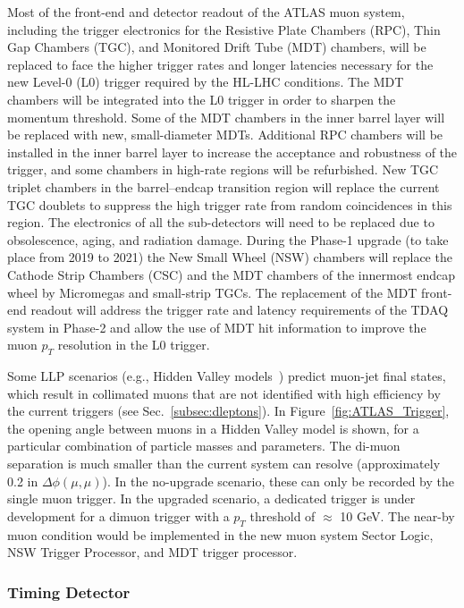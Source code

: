 Most of the front-end and detector readout of the ATLAS muon system, including the trigger electronics for the Resistive Plate Chambers (RPC), Thin Gap Chambers (TGC), and Monitored Drift Tube (MDT) chambers, will be replaced to face the higher trigger rates and longer latencies necessary for the new Level-0 (L0) trigger required by the HL-LHC conditions. The MDT chambers will be integrated into the L0 trigger in order to sharpen the momentum threshold. Some of the MDT chambers in the inner barrel layer will be replaced with new, small-diameter MDTs. Additional RPC chambers will be installed in the inner barrel layer to increase the acceptance and robustness of the trigger, and some chambers in high-rate regions will be refurbished. New TGC triplet chambers in the barrel--endcap transition region will replace the current TGC doublets to suppress the high trigger rate from random coincidences in this region. The electronics of all the sub-detectors will need to be replaced due to obsolescence, aging, and radiation damage. During the Phase-1 upgrade (to take place from 2019 to 2021) the New Small Wheel (NSW) chambers will replace the Cathode Strip Chambers (CSC) and the MDT chambers of the innermost endcap wheel by Micromegas and small-strip TGCs. The replacement of the MDT front-end readout will address the trigger rate and latency requirements of the TDAQ system in Phase-2 and allow the use of MDT hit information to improve the muon $p_T$ resolution in the L0 trigger.

Some LLP scenarios (e.g., Hidden Valley models~\cite{Strassler:2006im}) predict muon-jet final states, which result in collimated muons that are not identified with high efficiency by the current triggers (see Sec.~\ref{subsec:dleptons}). In Figure~\ref{fig:ATLAS_Trigger}, the opening angle between muons in a Hidden Valley model is shown, for a particular combination of particle masses and parameters. The di-muon separation is much smaller than the current system can resolve (approximately 0.2 in $\Delta\phi(\mu,\mu)$). In the no-upgrade scenario, these can only be recorded by the single muon trigger. In the upgraded scenario, a dedicated trigger is under development for a dimuon trigger with a $p_T$ threshold of $\approx$ 10 GeV. The near-by muon condition would be implemented in the new muon system Sector Logic, NSW Trigger Processor, and MDT trigger processor.

\subsubsection{Timing Detector} \label{sec:upgradetiming}

